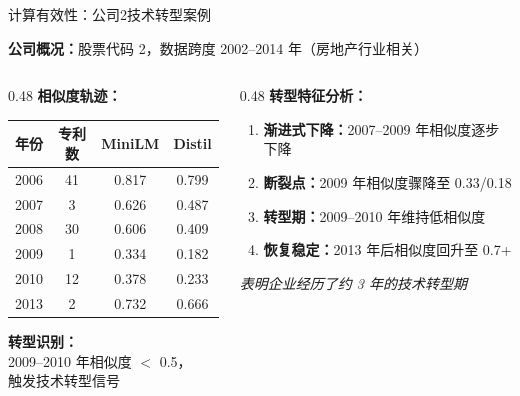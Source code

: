 \documentclass[aspectratio=169]{beamer}
\begin{document}
\begin{frame}{计算有效性：公司2技术转型案例}

\textbf{公司概况：}股票代码 2，数据跨度 2002--2014 年（房地产行业相关）

\vspace{0.3cm}

\begin{columns}[T]
\begin{column}{0.48\textwidth}
\textbf{相似度轨迹：}

\vspace{0.2cm}

\small
\begin{tabular}{cccc}
\toprule
年份 & 专利数 & MiniLM & Distil \\
\midrule
2006 & 41 & 0.817 & 0.799 \\
2007 & 3 & 0.626 & 0.487 \\
2008 & 30 & 0.606 & 0.409 \\
\rowcolor{red!15}
2009 & 1 & 0.334 & 0.182 \\
\rowcolor{red!15}
2010 & 12 & 0.378 & 0.233 \\
2013 & 2 & 0.732 & 0.666 \\
\bottomrule
\end{tabular}

\vspace{0.3cm}

\normalsize
\textbf{转型识别：}\\
2009--2010 年相似度 $<$ 0.5，\\
触发技术转型信号
\end{column}

\begin{column}{0.48\textwidth}
\textbf{转型特征分析：}

\vspace{0.2cm}

\begin{enumerate}
    \item \textbf{渐进式下降：}2007--2009 年相似度逐步下降
    \item \textbf{断裂点：}2009 年相似度骤降至 0.33/0.18
    \item \textbf{转型期：}2009--2010 年维持低相似度
    \item \textbf{恢复稳定：}2013 年后相似度回升至 0.7+
\end{enumerate}

\vspace{0.2cm}

\textit{表明企业经历了约 3 年的技术转型期}
\end{column}
\end{columns}

\end{frame}
\end{document}
